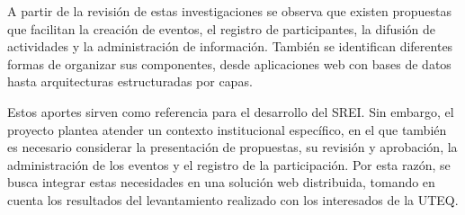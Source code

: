 A partir de la revisión de estas investigaciones se observa que existen propuestas que facilitan la creación de eventos, el registro de participantes, la difusión de actividades y la administración de información. También se identifican diferentes formas de organizar sus componentes, desde aplicaciones web con bases de datos hasta arquitecturas estructuradas por capas.

Estos aportes sirven como referencia para el desarrollo del SREI. Sin embargo, el proyecto plantea atender un contexto institucional específico, en el que también es necesario considerar la presentación de propuestas, su revisión y aprobación, la administración de los eventos y el registro de la participación. Por esta razón, se busca integrar estas necesidades en una solución web distribuida, tomando en cuenta los resultados del levantamiento realizado con los interesados de la UTEQ.
